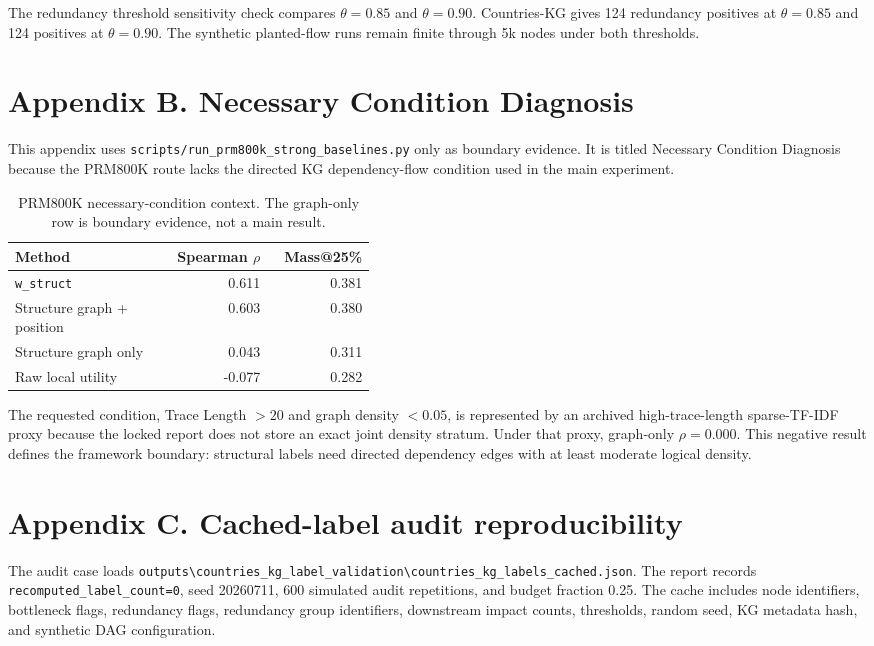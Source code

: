 \documentclass[pdflatex,sn-mathphys-num]{sn-jnl}
\begin{document}
The redundancy threshold sensitivity check compares $\theta=0.85$ and $\theta=0.90$. Countries-KG gives 124 redundancy positives at $\theta=0.85$ and 124 positives at $\theta=0.90$. The synthetic planted-flow runs remain finite through 5k nodes under both thresholds.

\section{Appendix B. Necessary Condition Diagnosis}

This appendix uses \texttt{scripts/run\_prm800k\_strong\_baselines.py} only as boundary evidence. It is titled Necessary Condition Diagnosis because the PRM800K route lacks the directed KG dependency-flow condition used in the main experiment.

\begin{table}[h]
\caption{PRM800K necessary-condition context. The graph-only row is boundary evidence, not a main result.}
\centering
\small
\begin{tabular}{Z{0.42\linewidth}rr}
\toprule
\textbf{Method} & \textbf{Spearman $\rho$} & \textbf{Mass@25\%} \\
\midrule
\texttt{w\_struct} & 0.611 & 0.381 \\
Structure graph + position & 0.603 & 0.380 \\
Structure graph only & 0.043 & 0.311 \\
Raw local utility & -0.077 & 0.282 \\
\bottomrule
\end{tabular}
\end{table}

The requested condition, Trace Length $>20$ and graph density $<0.05$, is represented by an archived high-trace-length sparse-TF-IDF proxy because the locked report does not store an exact joint density stratum. Under that proxy, graph-only $\rho=0.000$. This negative result defines the framework boundary: structural labels need directed dependency edges with at least moderate logical density.

\section{Appendix C. Cached-label audit reproducibility}

The audit case loads \texttt{outputs\textbackslash{}countries\_kg\_label\_validation\textbackslash{}countries\_kg\_labels\_cached.json}. The report records \texttt{recomputed\_label\_count=0}, seed 20260711, 600 simulated audit repetitions, and budget fraction 0.25. The cache includes node identifiers, bottleneck flags, redundancy flags, redundancy group identifiers, downstream impact counts, thresholds, random seed, KG metadata hash, and synthetic DAG configuration.


\end{document}
